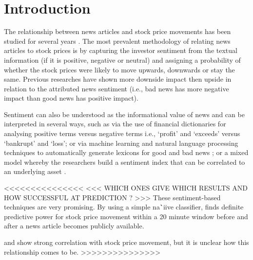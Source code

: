 \documentclass{article}
\begin{document}
\section{Introduction}
The relationship between news articles and stock price movements has been studied for several years \citep{gidofalvi2001}\citep{Fu2008}. The most prevalent methodology of relating news articles to stock prices is by capturing the investor sentiment \citep{Handbook} from the textual information (if it is positive, negative or neutral) and assigning a probability of whether the stock prices were likely to move upwards, downwards or stay the same. Previous researches \citep{FIND HERE} have shown more downside impact then upside in relation to the attributed news sentiment (i.e., bad news has more negative impact than good news has positive impact).
\par
Sentiment can also be understood as the informational value of news and can be interpreted in several ways, such as via the use of financial dictionaries for analysing positive terms versus negative terms 
i.e., `profit' and `exceeds' versus `bankrupt' and `loss'; or via machine learning and natural language processing techniques to automatically generate lexicons for good and bad news \citep{Oliveira2014}; or a mixed model \citep{GRAB ORIGINAL CITATIONPAGE 10 HANDBOOK} whereby the researchers build a sentiment index that can be correlated to an underlying asset \citep{GRAN ORIGINAL CITATION - PAGE 10 HANDBOOK}.
\par

<<<<<<<<<<<<<<<
<<< WHICH ONES GIVE WHICH RESULTS AND HOW SUCCESSFUL AT PREDICTION ? >>>
These sentiment-based techniques are very promising. By using a simple na\``{i}ive classifier, \citep{gidofalvi2001} finds definite predictive power for stock price movement within a 20 minute window before and after a news article becomes publicly available.

and show strong correlation with stock price movement, but it is unclear how this relationship comes to be.
>>>>>>>>>>>>>>>
\end{document}
